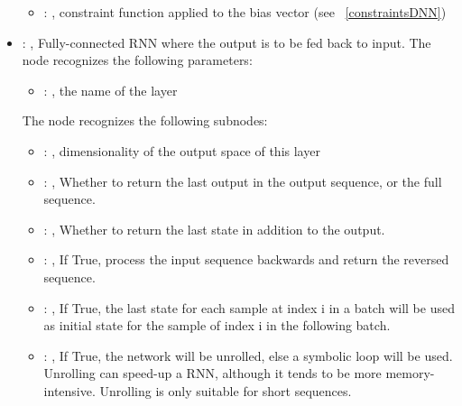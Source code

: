 \begin{itemize}
\begin{itemize}
        \item {}: , 
          constraint function applied to the bias vector (see ~\ref{constraintsDNN})
      \end{itemize}

    \item {}: , 
      Fully-connected RNN where the output is to be fed back to input.
      The  node recognizes the following parameters:
        \begin{itemize}
          \item {}: , 
            the name of the layer
      \end{itemize}

      The  node recognizes the following subnodes:
      \begin{itemize}
        \item {}: , 
          dimensionality of the output space of this layer

        \item {}: , 
          Whether to return the last output in the output sequence, or the full sequence.

        \item {}: , 
          Whether to return the last state in addition to the output.

        \item {}: , 
          If True, process the input sequence backwards and return the reversed sequence.

        \item {}: , 
          If True, the last state for each sample at index i in a batch will be used as initial
          state for the         sample of index i in the following batch.

        \item {}: , 
          If True, the network will be unrolled, else a symbolic loop will be used. Unrolling can
          speed-up a         RNN, although it tends to be more memory-intensive. Unrolling is only
          suitable for short sequences.
      \end{itemize}


\end{itemize}
